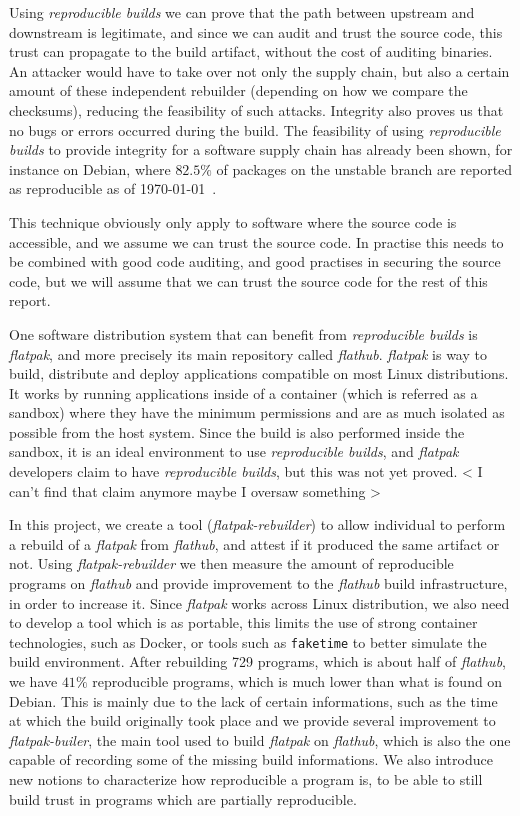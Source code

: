 \documentclass[a4paper,11pt,oneside]{report}
\theoremstyle{definition}
\newcommand{\sysname}{\emph{flatpak-rebuilder}\xspace}
\newcommand{\rb}{\emph{reproducible builds}\xspace}
\newcommand{\fp}{\emph{flatpak}\xspace}
\newcommand{\fh}{\emph{flathub}\xspace}
\newcommand{\fb}{\emph{flatpak-builer}\xspace}
\begin{document}
Using \rb we can prove that the path between upstream and downstream is
legitimate, and since we can audit and trust the source code, this trust can
propagate to the build artifact, without the cost of auditing binaries. An
attacker would have to take over not only the supply chain, but also a certain
amount of these independent rebuilder (depending on how we compare the
checksums), reducing the feasibility of such attacks. Integrity also proves us
that no bugs or errors occurred during the build. The feasibility of using \rb
to provide integrity for a software supply chain has already been shown, for
instance on Debian, where $82.5\%$ of packages on the unstable branch are
reported as reproducible as of \today~\cite{debian:repro}.

This technique obviously only apply to software where the source code is
accessible, and we assume we can trust the source code. In practise this needs
to be combined with good code auditing, and good practises in securing the
source code, but we will assume that we can trust the source code for the rest
of this report.

One software distribution system that can benefit from \rb is \fp, and more
precisely its main repository called \fh. \fp is way to build, distribute and
deploy applications compatible on most Linux distributions. It works by running
applications inside of a container (which is referred as a sandbox) where they
have the minimum permissions and are as much isolated as possible from the host
system. Since the build is also performed inside the sandbox, it is an ideal
environment to use \rb, and \fp developers claim to have \rb, but this was not
yet proved.
< I can't find that claim anymore maybe I oversaw something >

In this project, we create a tool (\sysname) to allow individual to perform a
rebuild of a \fp from \fh, and attest if it produced the same artifact or not.
Using \sysname we then measure the amount of reproducible programs on \fh and
provide improvement to the \fh build infrastructure, in order to increase it.
Since \fp works across Linux distribution, we also need to develop a tool which
is as portable, this limits the use of strong container technologies, such as
Docker, or tools such as \verb|faketime| to better simulate the build
environment.
After rebuilding 729 programs, which is about half of \fh, we have $41\%$
reproducible programs, which is much lower than what is found on Debian. This
is mainly due to the lack of certain informations, such as the time at which
the build originally took place and we provide several improvement to \fb, the
main tool used to build \fp on \fh, which is also the one capable of recording
some of the missing build informations. We also introduce new notions to
characterize how reproducible a program is, to be able to still build trust in
programs which are partially reproducible.
\end{document}
